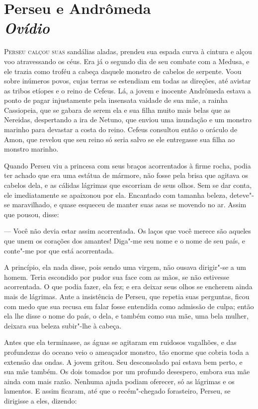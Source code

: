 \pagestyle{myheadings}
\cleardoublepage

\chapter[Perseu e Andrômeda\\{\itshape Ovídio}]{Perseu e Andrômeda\\{\LARGE\itshape Ovídio}}

\textsc{Perseu calçou suas} sandálias aladas, prendeu sua
espada curva à cintura e 
alçou voo atravessando os céus. Era já o segundo dia 
de seu combate com a Medusa, e ele trazia como troféu a cabeça
daquele monstro de cabelos de serpente. Voou sobre inúmeros povos,
cujas terras se estendiam em todas as direções, até avistar as tribos
etíopes e o reino de Cefeus. Lá, a jovem e inocente Andrômeda estava
a ponto de pagar injustamente pela insensata vaidade de sua mãe, a
rainha Cassiopeia, que se gabara de serem ela e sua filha muito mais
belas que as Nereidas, despertando a ira de Netuno, que enviou uma
inundação e um monstro marinho para devastar a costa do reino.
Cefeus consultou então o oráculo de Amon, que revelou que
seu reino só seria salvo se ele entregasse sua filha ao monstro
marinho.

Quando Perseu viu a princesa com seus braços acorrentados à firme
rocha, podia ter achado que era uma estátua de mármore, não fosse pela
brisa que agitava os cabelos dela, e as cálidas lágrimas que
escorriam de seus olhos. Sem se dar conta, ele imediatamente se
apaixonou por ela. Encantado com tamanha beleza, deteve"-se
maravilhado, e quase esqueceu de manter suas asas se movendo no ar.
Assim que pousou, disse:

--- Você não devia estar assim acorrentada. Os laços que você merece são
aqueles que unem os corações dos amantes! Diga"-me seu nome
e o nome de seu país, e conte"-me por que está acorrentada.

A princípio, ela nada disse, pois sendo uma virgem, não ousava
dirigir"-se a um homem. Teria escondido por pudor sua face com as
mãos, se não estivesse acorrentada. O que podia fazer, ela
fez; e era deixar seus olhos se encherem ainda mais de lágrimas. Ante
a insistência de Perseu, que repetia suas perguntas, ficou com medo
que sua recusa em falar fosse entendida como admissão de culpa; então
ela lhe disse o nome do país, o dela, e também como sua mãe, uma bela
mulher, deixara sua beleza subir"-lhe à cabeça.

Antes que ela terminasse, as águas se agitaram em ruidosos vagalhões,
e das profundezas do oceano veio o ameaçador monstro, tão enorme que
cobria toda a extensão das ondas. A jovem gritou. Seu desconsolado
pai estava bem perto, e sua mãe também. Os dois tomados por
um profundo desespero, embora sua mãe ainda com mais razão. Nenhuma
ajuda podiam oferecer, só as lágrimas e os lamentos. 
E assim ficaram, até que o recém"-chegado
forasteiro, Perseu, se dirigisse a eles, dizendo:

